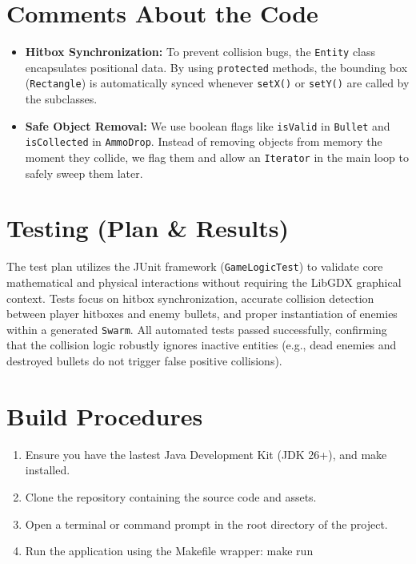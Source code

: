\documentclass[12pt, a4paper]{article}
\begin{document}
\section{Comments About the Code}
\begin{itemize}
    \item \textbf{Hitbox Synchronization:} To prevent collision bugs, the \texttt{Entity} class encapsulates positional data. By using \texttt{protected} methods, the bounding box (\texttt{Rectangle}) is automatically synced whenever \texttt{setX()} or \texttt{setY()} are called by the subclasses.
    \item \textbf{Safe Object Removal:} We use boolean flags like \texttt{isValid} in \texttt{Bullet} and \texttt{isCollected} in \texttt{AmmoDrop}. Instead of removing objects from memory the moment they collide, we flag them and allow an \texttt{Iterator} in the main loop to safely sweep them later.
\end{itemize}

\section{Testing (Plan \& Results)}
The test plan utilizes the JUnit framework (\texttt{GameLogicTest}) to validate core mathematical and physical interactions without requiring the LibGDX graphical context. Tests focus on hitbox synchronization, accurate collision detection between player hitboxes and enemy bullets, and proper instantiation of enemies within a generated \texttt{Swarm}. All automated tests passed successfully, confirming that the collision logic robustly ignores inactive entities (e.g., dead enemies and destroyed bullets do not trigger false positive collisions).

\section{Build Procedures}
\begin{enumerate}
    \item Ensure you have the lastest Java Development Kit (JDK 26+), and make installed.
    \item Clone the repository containing the source code and assets.
    \item Open a terminal or command prompt in the root directory of the project.
    \item Run the application using the Makefile wrapper: make run
\end{enumerate}
\end{document}
